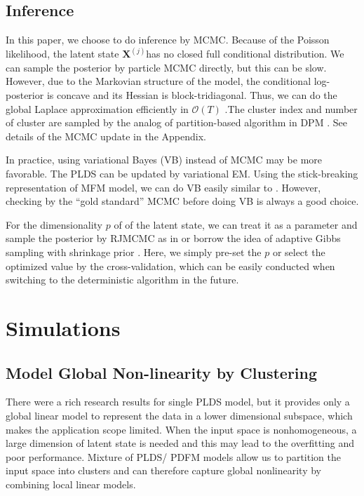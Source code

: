 \documentclass{article}
\begin{document}
	\subsection{Inference}
	
	In this paper, we choose to do inference by MCMC. Because of the Poisson likelihood, the latent state $\bm{X}^{(j)}$has no closed full conditional distribution. We can sample the posterior by particle MCMC directly, but this can be slow. However, due to the Markovian structure of the model, the conditional log-posterior is concave and its Hessian is block-tridiagonal. Thus, we can do the global Laplace approximation efficiently in $\mathcal{O}(T)$ \citep{Paninski2010}.The cluster index and number of cluster are sampled by the analog of partition-based algorithm in DPM \citep{Neal2000}. See details of the MCMC update in the Appendix.
	
	In practice, using variational Bayes (VB) instead of MCMC may be more favorable. The PLDS can be updated by variational EM. Using the stick-breaking representation of MFM model, we can do VB easily similar to \citet{Blei2006}. However, checking by the “gold standard” MCMC before doing VB is always a good choice.
	
	For the dimensionality $p$ of of the latent state, we can treat it as a parameter and sample the posterior by RJMCMC as in \citet{Lopes2004} or borrow the idea of adaptive Gibbs sampling with shrinkage prior \citep{Bhattacharya2011}. Here, we simply pre-set the $p$ or select the optimized value by the cross-validation, which can be easily conducted when switching to the deterministic algorithm in the future. 
	
	\section{Simulations}
	\label{sim}
	
	\subsection{Model Global Non-linearity by Clustering}
	There were a rich research results for single PLDS model, but it provides only a global linear model to represent the data in a lower dimensional subspace, which makes the application scope limited. When the input space is nonhomogeneous, a large dimension of latent state is needed and this may lead to the overfitting and poor performance. Mixture of PLDS/ PDFM models allow us to partition the input space into clusters and can therefore capture global nonlinearity by combining local linear models.
	
\end{document}
